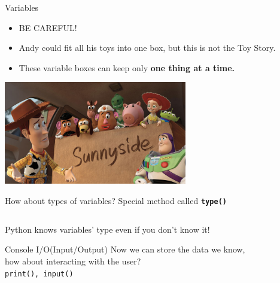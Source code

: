 		
		\begin{frame}{Variables}
		    \begin{itemize}
		        \item \LARGE BE CAREFUL!
		        \vspace{2mm}
				\pause
				\item \large
				Andy could fit all his toys into one box, but this is not the Toy Story.
				\pause
				\item \LARGE
				These variable boxes can keep only \textbf{one thing at a time.}
		    \end{itemize}
			\vspace{2mm}
		    \centering
            \includegraphics[width=0.6\textwidth]{images/box_many.jpg}
		\end{frame}
		
		\begin{frame}{How about types of variables?}
			\LARGE
			Special method called \texttt{\textbf{type()}} 
			\inputminted[frame=single,framesep=2pt]{python3}{code-examples/types.py}
			Python knows variables' type even if you don't know it!
		\end{frame}

		\begin{frame}{Console I/O(Input/Output)}
			\LARGE
			Now we can store the data we know, \\
			\pause
			how about interacting with the user? \\
			\pause
			\texttt{print(), input()}
			\pause
			\inputminted[frame=single,framesep=2pt]{python3}{code-examples/io.py}
		\end{frame}

